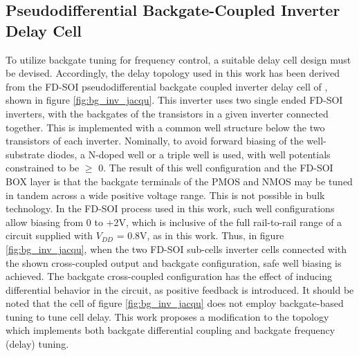 



		
		\FloatBarrier\pagebreak
		\subsection{Pseudodifferential Backgate-Coupled Inverter Delay Cell}\label{sec:pd_inv}
		To utilize backgate tuning for frequency control, a suitable delay cell design must be devised. Accordingly, the delay topology used in this work has been derived from the FD-SOI pseudodifferential backgate coupled inverter delay cell of \cite{Jacquemod2019}, shown in figure \ref{fig:bg_inv_jacqu}. This inverter uses two single ended FD-SOI inverters, with the backgates of the transistors in a given inverter connected together. This is implemented with a common well structure below the two transistors of each inverter. Nominally, to avoid forward biasing of the well-substrate diodes, a N-doped well or a triple well is used, with well potentials constrained to be $\geq$ 0. The result of this well configuration and the FD-SOI BOX layer is that the backgate terminals of the PMOS and NMOS may be tuned in tandem across a wide positive voltage range. This is not possible in bulk technology. In the FD-SOI process used in this work, such well configurations allow biasing from 0 to +2V, which is inclusive of the full rail-to-rail range of a circuit supplied with $V_{DD}$ = 0.8V, as in this work. Thus, in figure \ref{fig:bg_inv_jacqu}, when the two FD-SOI sub-cells inverter cells connected with the shown cross-coupled output and backgate configuration, safe well biasing is achieved. The backgate cross-coupled configuration has the effect of inducing differential behavior in the circuit, as positive feedback is introduced. It should be noted that the cell of figure \ref{fig:bg_inv_jacqu} does not employ backgate-based tuning to tune cell delay. This work proposes a modification to the topology which implements both backgate differential coupling and backgate frequency (delay) tuning.

